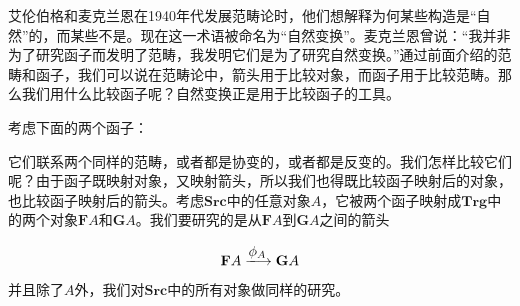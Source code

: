 \documentclass{article}
\begin{document}

艾伦伯格和麦克兰恩在1940年代发展范畴论时，他们想解释为何某些构造是“自然”的，而某些不是。现在这一术语被命名为“自然变换”。麦克兰恩曾说：“我并非为了研究函子而发明了范畴，我发明它们是为了研究自然变换。”通过前面介绍的范畴和函子，我们可以说在范畴论中，箭头用于比较对象，而函子用于比较范畴。那么我们用什么比较函子呢？自然变换正是用于比较函子的工具。


考虑下面的两个函子：

\begin{center}
\end{center}

它们联系两个同样的范畴，或者都是协变的，或者都是反变的。我们怎样比较它们呢？由于函子既映射对象，又映射箭头，所以我们也得既比较函子映射后的对象，也比较函子映射后的箭头。考虑$\pmb{Src}$中的任意对象$A$，它被两个函子映射成$\pmb{Trg}$中的两个对象$\mathbf{F}A$和$\mathbf{G}A$。我们要研究的是从$\mathbf{F}A$到$\mathbf{G}A$之间的箭头

\[
\mathbf{F}A \arrowto{\phi_A} \mathbf{G}A
\]

并且除了$A$外，我们对$\pmb{Src}$中的所有对象做同样的研究。
\end{document}
